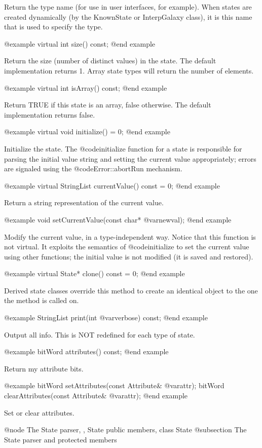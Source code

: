 Return the type name (for use in user interfaces, for example).
When states are created dynamically (by the KnownState or InterpGalaxy
class), it is this name that is used to specify the type.

@example
virtual int size() const;
@end example

Return the size (number of distinct values) in the state.  The
default implementation returns 1.  Array state types will return the
number of elements.

@example
virtual int isArray() const;
@end example

Return TRUE if this state is an array, false otherwise.  The default
implementation returns false.

@example
virtual void initialize() = 0;
@end example

Initialize the state.  The @code{initialize} function for a state is
responsible for parsing the initial value string and setting the current
value appropriately; errors are signaled using the
@code{Error::abortRun} mechanism.

@example
virtual StringList currentValue() const = 0;
@end example

Return a string representation of the current value.

@example
void setCurrentValue(const char* @var{newval});
@end example

Modify the current value, in a type-independent way.  Notice that this
function is not virtual.  It exploits the semantics of @code{initialize}
to set the current value using other functions; the initial value is
not modified (it is saved and restored).

@example
virtual State* clone() const = 0;
@end example

Derived state classes override this method to create an identical
object to the one the method is called on.

@example
StringList print(int @var{verbose}) const;
@end example

Output all info.  This is NOT redefined for each type of state.

@example
bitWord attributes() const;
@end example

Return my attribute bits.

@example
bitWord setAttributes(const Attribute& @var{attr});
bitWord clearAttributes(const Attribute& @var{attr});
@end example

Set or clear attributes.

@node The State parser,  , State public members, class State
@subsection The State parser and protected members


